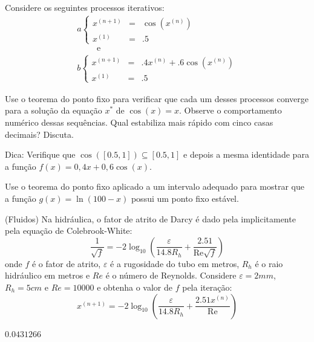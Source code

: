 \begin{exer} Considere os seguintes processos iterativos:
\begin{equation}
\begin{array}{l}
a\left\{\begin{array}{rcl}
x^{(n+1)}&=&\cos(x^{(n)})\\
x^{(1)}&=&.5
\end{array}
\right. \\ \qquad \text { e }\\
b\left\{\begin{array}{rcl}
x^{(n+1)}&=&.4x^{(n)}+.6\cos(x^{(n)})\\
x^{(1)}&=&.5
\end{array}
\right.
\end{array}
\end{equation}

Use o teorema do ponto fixo para verificar que cada um desses processos converge para a solução da equação $x^*$ de $\cos(x)=x$. Observe o comportamento numérico dessas sequências. Qual estabiliza mais rápido com cinco casas decimais? Discuta.

Dica: Verifique que $\cos([0.5,1])\subseteq [0.5,1]$ e depois a mesma identidade para a função $f(x)=0,4x+0,6\cos(x)$.
\end{exer}


\begin{exer}  Use o teorema do ponto fixo aplicado a um intervalo adequado para mostrar que a função $g(x)=\ln (100-x)$ possui um ponto fixo estável.
\end{exer}

\begin{exer}(Fluidos) Na hidráulica, o fator de atrito de Darcy é dado pela implicitamente pela equação de Colebrook-White:
\begin{equation} \frac{1}{\sqrt{f}}= -2 \log_{10} \left( \frac{\varepsilon}{14.8 R_h} + \frac{2.51}{\mathrm{Re}\sqrt{f}} \right) \end{equation}
onde $f$ é o fator de atrito, $\varepsilon$ é a rugosidade do tubo em metros, $R_{h}$ é o raio hidráulico em metros e ${Re}$ é o número de Reynolds. Considere $\varepsilon=2mm$, $R_{h}=5cm$ e ${Re}=10000$ e obtenha o valor de $f$ pela iteração:
\begin{equation} x^{(n+1)}=-2 \log_{10} \left( \frac{\varepsilon}{14.8 R_{h}} + \frac{2.51x^{(n)}}{\mathrm{Re}} \right) \end{equation}
\end{exer}
\begin{resp}

$0.0431266$

\end{resp}

